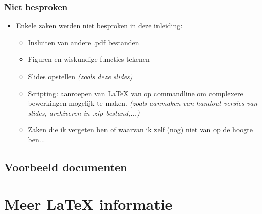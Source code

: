 \documentclass{beamer}
\begin{document}
\begin{frame}
\frametitle{Niet besproken}
\begin{itemize}[<+->]
 \item Enkele zaken werden niet besproken in deze inleiding:
    \begin{itemize}
    \item Insluiten van andere .pdf bestanden
    \item Figuren en wiskundige functies tekenen
    \item Slides opstellen \textit{(zoals deze slides)}
    \item Scripting: aanroepen van \LaTeX $ $ van op commandline om complexere bewerkingen mogelijk te maken. \textit{(zoals aanmaken van handout versies van slides, archiveren in .zip bestand,...)}
    \item Zaken die ik vergeten ben of waarvan ik zelf (nog) niet van op de hoogte ben...
    \end{itemize}
\end{itemize}
\end{frame}





\subsection{Voorbeeld documenten}













\section{Meer \LaTeX $ $ informatie}
\end{document}
